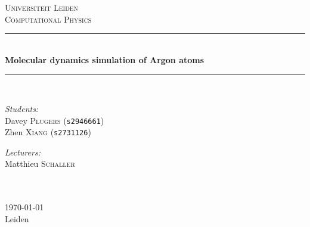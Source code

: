 \documentclass[a4paper,12pt]{article} %
\begin{document}

\begin{titlepage}

\newcommand{\HRule}{\rule{\linewidth}{0.5mm}} %

\center %
\begin{figure}[H]  \end{figure}
\textsc{\LARGE Universiteit Leiden}\\[1.5cm] %
\textsc{\Large Computational Physics}\\[0.5cm] %


\HRule \\[0.4cm]
{ \huge \bfseries Molecular dynamics simulation of Argon atoms}\\[0.4cm] %
\HRule \\[1.5cm]

\begin{minipage}{0.45\textwidth}
\begin{flushleft} \large
\emph{Students:}\\
Davey \textsc{Plugers} \small{(\texttt{s2946661})}\\
\large Zhen \textsc{Xiang} \small{(\texttt{s2731126})} %
\end{flushleft}
\end{minipage}
\begin{minipage}{0.4\textwidth}
\begin{flushright} \large
\emph{Lecturers:} \\
\large Matthieu \textsc{Schaller}\\ %
\hspace{1cm} \\
\end{flushright}
\end{minipage}\\[4cm]

{\large \today\\Leiden}\\[3cm] %

\vfill %

\end{titlepage}
\end{document}
